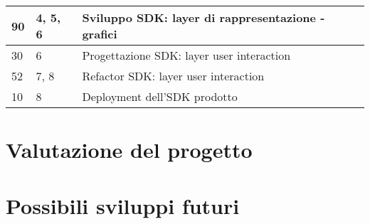 \begin{center}
\begin{longtable}{|p{2.5cm}|p{2.5cm}|p{7.5cm}|}
        \hline
        90                                 & 4, 5, 6                                          & Sviluppo SDK: layer di  rappresentazione - grafici                              \\
        \hline
        30                                 & 6                                                & Progettazione SDK: layer user interaction                                       \\
        \hline
        52                                 & 7, 8                                             & Refactor SDK: layer user interaction                                            \\
        \hline
        10                                 & 8                                                & Deployment dell'SDK prodotto                                                    \\
    \end{longtable}
    \label{tab:consuntivo_finale}
\end{center}


\section{Valutazione del progetto}

\section{Possibili sviluppi futuri}


